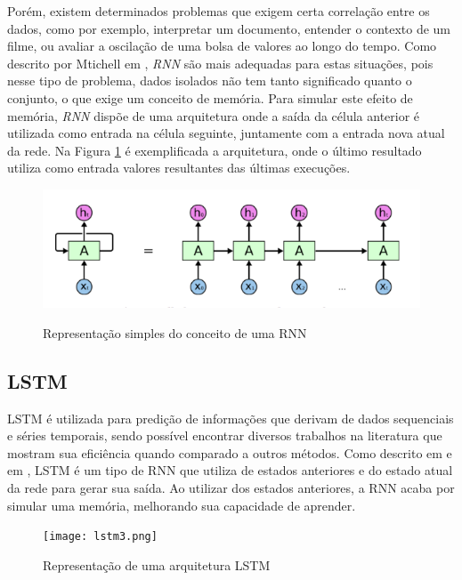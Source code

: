 Porém, existem determinados problemas que exigem certa correlação entre os dados, como por exemplo, interpretar um documento, entender o contexto de um filme, ou avaliar a oscilação de uma bolsa de valores ao longo do tempo. Como descrito por Mtichell em \cite{mitchell1997}, \textit{\acrshort{RNN}} são mais adequadas para estas situações, pois nesse tipo de problema, dados isolados não tem tanto significado quanto o conjunto, o que exige um conceito de memória. Para simular este efeito de memória, \textit{\acrshort{RNN}} dispõe de uma arquitetura onde a saída da célula anterior é utilizada como entrada na célula seguinte, juntamente com a entrada nova atual da rede. Na Figura \ref{figure:rnn} é exemplificada a arquitetura, onde o último resultado utiliza como entrada valores resultantes das últimas execuções.

\begin{figure}[htbp]
    \centering
    \includegraphics[scale=0.4]{rnnExample.png}
    \label{figure:rnn}
    \caption[Representação simples do conceito de um RNN]{Representação simples do conceito de uma RNN \footnotemark}
\end{figure}

\subsection{\acrfull{LSTM}}

\acrshort{LSTM} é utilizada para predição de informações que derivam de dados sequenciais e séries temporais, sendo possível encontrar diversos trabalhos na literatura que mostram sua eficiência quando comparado a outros métodos. Como descrito em \cite{Zainab_2018} e em \cite{Xiaolei_2015}, \acrshort{LSTM} é um tipo de \acrshort{RNN} que utiliza de estados anteriores e do estado atual da rede para gerar sua saída. Ao utilizar dos estados anteriores, a \acrshort{RNN} acaba por simular uma memória, melhorando sua capacidade de aprender. 

\begin{figure}[htbp]
    \centering
    \texttt{[image: lstm3.png]}
    \label{figure:eixo}
    \caption[Representação de uma arquitetura LSTM]{Representação de uma arquitetura LSTM\footnotemark}
\end{figure}

